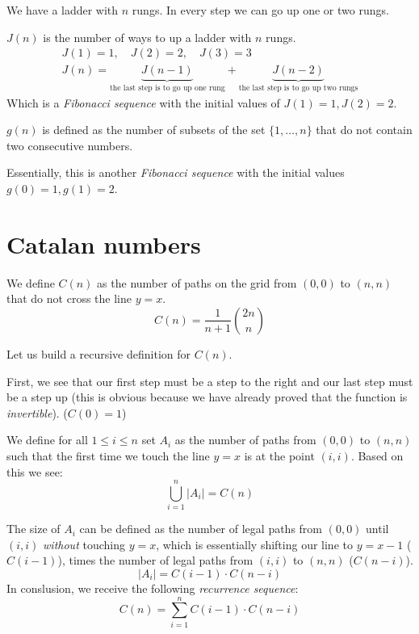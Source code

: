 \documentclass[00_complete]{subfiles}
\begin{document}
\begin{example}
        We have a ladder with $n$ rungs. In every step we can go up one
        or two rungs.

        $J(n)$ is the number of ways to up a ladder with $n$ rungs.
        \begin{gather*}
        J(1)=1, \quad J(2)=2, \quad J(3)=3 \\
        J(n) =
        \underbrace{J(n-1)}_{\text{the last step is to go up one rung}}+
        \underbrace{J(n-2)}_{\text{the last step is to go up two rungs}}
        \end{gather*}
        Which is a \emph{Fibonacci sequence} with the initial values of
        $J(1)=1, J(2)=2$.
\end{example}
\begin{example}
    $g(n)$ is defined as the number of subsets of the set $\{1,\dots,n\}$ that do not contain two
    consecutive numbers.

    Essentially, this is another \emph{Fibonacci sequence} with the initial
    values $g(0)=1,g(1)=2$.
\end{example}
\section{Catalan numbers}
\begin{definition}
    We define $C(n)$ as the number of paths on the grid from $(0,0)$ to $(n,n)$
    that do not cross the line $y=x$.
    $$C(n)=\frac{1}{n+1}\binom{2n}{n}$$
\end{definition}
Let us build a recursive definition for $C(n)$.

First, we see that our first step must be a step to the right and our last step
must be a step up (this is obvious because we have already proved that the
function is \emph{invertible}). ($C(0)=1$)

We define for all $1 \leq i \leq n$ set $A_i$ as the number of paths from
$(0,0)$ to $(n,n)$ such that the first time we touch the line $y=x$ is at the
point $(i,i)$. Based on this we see:
$$\bigcup_{i=1}^n|A_i| = C(n)$$

The size of $A_i$ can be defined as the number of legal paths from $(0,0)$ until
$(i,i)$ \emph{without} touching $y=x$, which is essentially shifting our line
to $y=x-1$ ($C(i-1)$), times the number of legal paths from $(i,i)$ to $(n,n)$
($C(n-i)$).
$$|A_i|=C(i-1) \cdot C(n-i)$$
In conslusion, we receive the following \emph{recurrence sequence}:
$$C(n) = \sum_{i=1}^{n}C(i-1)\cdot C(n-i)$$
\end{document}
